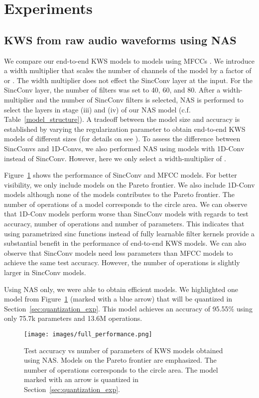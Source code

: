 \documentclass[a4paper]{article}
\begin{document}
\section{Experiments}
\label{sec:experiments}

\subsection{KWS from raw audio waveforms using NAS}
We compare our end-to-end KWS models to models using MFCCs \cite{Peter2020}. We introduce a width multiplier  that scales the number of channels of the model by a factor of  or . The width multiplier does not effect the SincConv layer at the input. For the SincConv layer, the number of filters was set to 40, 60, and 80. After a width-multiplier and the number of SincConv filters is selected, NAS is performed to select the layers in stage (iii) and (iv) of our NAS model (c.f. Table~\ref{model_structure}). A tradeoff between the model size and accuracy is established by varying the regularization parameter  to obtain end-to-end KWS models of different sizes (for details on  see \cite{Peter2020}). To assess the difference between SincConvs and 1D-Convs, we also performed NAS using models with 1D-Conv instead of SincConv. However, here we only select a width-multiplier of .

Figure~\ref{fig:full_performance} shows the performance of SincConv and MFCC models. For better visibility, we only include models on the Pareto frontier. We also include 1D-Conv models although none of the models contributes to the Pareto frontier. The number of operations of a model corresponds to the circle area. We can observe that 1D-Conv models perform worse than SincConv models with regards to test accuracy, number of operations and number of parameters. This indicates that using parametrized sinc functions instead of fully learnable filter kernels provide a substantial benefit in the performance of end-to-end KWS models. We can also observe that SincConv models need less parameters than MFCC models to achieve the same test accuracy. However, the number of operations is slightly larger in SincConv models.

Using NAS only, we were able to obtain efficient models. We highlighted one model from Figure~\ref{fig:full_performance} (marked with a blue arrow) that will be quantized in Section~\ref{sec:quantization_exp}. This model achieves an accuracy of 95.55\% using only 75.7k parameters and 13.6M operations.

\begin{figure}[t]
	\centerline{\texttt{[image: images/full\_performance.png]}}
	\caption{Test accuracy vs number of parameters of KWS models obtained using NAS. Models on the Pareto frontier are emphasized. The number of operations corresponds to the circle area. The model marked with an arrow is quantized in Section~\ref{sec:quantization_exp}.}
	\label{fig:full_performance}
\end{figure}
\end{document}
